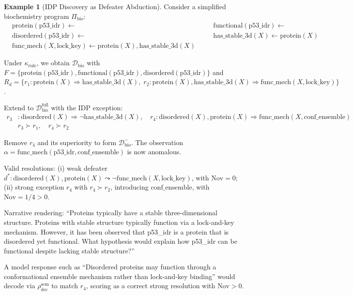\documentclass{article}
\theoremstyle{definition}
\newtheorem{example}[theorem]{Example}
\newcommand{\D}{\mathcal{D}}
\newcommand{\Dm}{\mathcal{D}^{-}}
\newcommand{\Dfull}{\mathcal{D}^{\mathrm{full}}}
\newcommand{\Rd}{R_d}
\newcommand{\partfunc}{\kappa}
\newcommand{\Nov}{\mathrm{Nov}}
\newcommand{\defto}{\Rightarrow}
\newcommand{\defeatto}{\leadsto}
\begin{document}
\begin{example}[IDP Discovery as Defeater Abduction]\label{ex:idp}
Consider a simplified biochemistry program $\Pi_{\mathrm{bio}}$:
\begin{align*}
    &\text{protein}(\text{p53\_idr}) \leftarrow &\quad &\text{functional}(\text{p53\_idr}) \leftarrow \\
    &\text{disordered}(\text{p53\_idr}) \leftarrow &\quad &\text{has\_stable\_3d}(X) \leftarrow \text{protein}(X) \\
    &\text{func\_mech}(X, \text{lock\_key}) \leftarrow \text{protein}(X), \text{has\_stable\_3d}(X)
\end{align*}

Under $\partfunc_{\mathrm{rule}}$, we obtain $\D_{\mathrm{bio}}$ with $F = \{\text{protein}(\text{p53\_idr}), \text{functional}(\text{p53\_idr}), \text{disordered}(\text{p53\_idr})\}$ and $\Rd = \{r_1\colon \text{protein}(X) \defto \text{has\_stable\_3d}(X),\; r_2\colon \text{protein}(X), \text{has\_stable\_3d}(X) \defto \text{func\_mech}(X, \text{lock\_key})\}$.

Extend to $\Dfull_{\mathrm{bio}}$ with the IDP exception:
\begin{align*}
    r_3 &\colon \text{disordered}(X) \defto \neg\text{has\_stable\_3d}(X), \quad
    r_4 \colon \text{disordered}(X), \text{protein}(X) \defto \text{func\_mech}(X, \text{conf\_ensemble}) \\
    &r_3 \succ r_1, \quad r_4 \succ r_2
\end{align*}

Remove $r_4$ and its superiority to form $\Dm_{\mathrm{bio}}$. The observation $\alpha = \text{func\_mech}(\text{p53\_idr}, \text{conf\_ensemble})$ is now anomalous.

Valid resolutions: (i) weak defeater $d^*\colon \text{disordered}(X), \text{protein}(X) \defeatto \neg\text{func\_mech}(X, \text{lock\_key})$, with $\Nov = 0$; (ii) strong exception $r_4$ with $r_4 \succ r_2$, introducing $\text{conf\_ensemble}$, with $\Nov = 1/4 > 0$.

Narrative rendering: ``Proteins typically have a stable three-dimensional structure. Proteins with stable structure typically function via a lock-and-key mechanism. However, it has been observed that p53\_idr is a protein that is disordered yet functional. What hypothesis would explain how p53\_idr can be functional despite lacking stable structure?''

A model response such as ``Disordered proteins may function through a conformational ensemble mechanism rather than lock-and-key binding'' would decode via $\rho_{\mathrm{dec}}^{\mathrm{sem}}$ to match $r_4$, scoring as a correct strong resolution with $\Nov > 0$.
\end{example}
\end{document}
